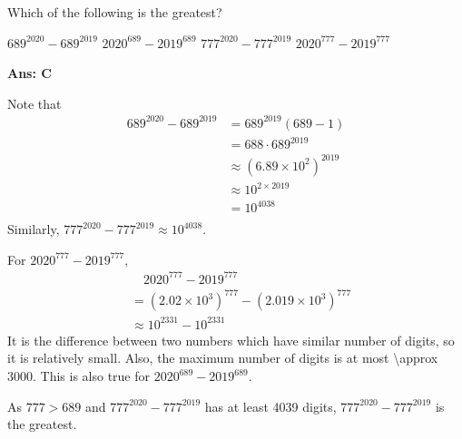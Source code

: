 \documentclass[varwidth=70mm]{standalone}
\begin{document}
Which of the following is the greatest?

\begin{choices}
\choice $689^{2020} - 689^{2019}$
\choice $2020^{689} - 2019^{689}$
\choice $777^{2020} - 777^{2019}$%
\choice $2020^{777} - 2019^{777}$
\end{choices}

\begin{answer}
\hrulefill\par
\textbf{Ans: C}

Note that
\begin{equation*}
\begin{aligned}
689^{2020} - 689^{2019} &= 689^{2019}(689 - 1) \\
						&= 688\cdot 689^{2019} \\
						&\approx (6.89\times 10^2)^{2019} \\
						&\approx 10^{2\times 2019} \\
						&= 10^{4038} \\ 
\end{aligned}
\end{equation*}
Similarly, $777^{2020} - 777^{2019} \approx 10^{4038}$.

For $2020^{777} - 2019^{777}$,
\begin{equation*}
\begin{aligned}
&\quad 2020^{777} - 2019^{777}  \\
&= (2.02\times 10^3)^{777} - (2.019\times 10^3)^{777} \\
&\approx 10^{2331} - 10^{2331}  
\end{aligned}
\end{equation*}
It is the difference between two numbers which have similar number of digits, so it is relatively small. Also, the maximum number of digits is at most \num{\approx 3000}. This is also true for $2020^{689} - 2019^{689}$.

As $777>689$ and $777^{2020} - 777^{2019}$ has at least 4039 digits, $777^{2020} - 777^{2019}$ is the greatest.

\end{answer}
\end{document}
